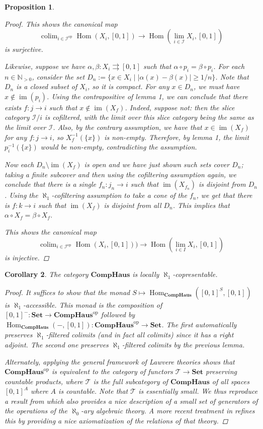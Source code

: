\documentclass[a4paper,12pt,reqno]{amsart}
\newtheorem{proposition}{Proposition}
\newtheorem{corollary}[proposition]{Corollary}
\newcommand{\Hom}{\operatorname{Hom}}
\newcommand{\op}{\operatorname{op}}
\newcommand{\CompHaus}{\mathbf{CompHaus}}
\newcommand{\Set}{\mathbf{Set}}
\newcommand{\im}{\operatorname{im}}
\newcommand{\I}{\mathcal{I}}
\newcommand{\calT}{\mathcal{T}}
\newcommand{\INnz}{\mathbb{N}_{>0}}
\newcommand{\colim}{\operatorname{colim}}
\begin{document}
\begin{proposition}
\begin{proof}
		This shows the canonical map
		$$\colim_{i\in \I^{\op}} \Hom(X_i, [0,1]) \to \Hom(\lim_{i\in \I} X_i, [0,1])$$
		is surjective.
		
		Likewise, suppose we have $\alpha, \beta : X_i \rightrightarrows [0,1]$ such that $\alpha \circ p_i = \beta \circ p_i$. For each $n\in \INnz$, consider the set $D_n := \{ x \in X_i \mid |\alpha(x) - \beta(x)| \ge 1/n \}$. Note that $D_n$ is a closed subset of $X_i$, so it is compact. For any $x \in D_n$, we must have $x \notin \im(p_i)$. Using the contrapositive of lemma 1, we can conclude that there exists $f : j \to i$ such that $x \not\in \im(X_f)$. Indeed, suppose not: then the slice category $\I / i$ is cofiltered, with the limit over this slice category being the same as the limit over $\I$. Also, by the contrary assumption, we have that $x \in \im(X_f)$ for any $f : j \to i$, so $X_f^{-1}(\{ x \})$ is non-empty. Therefore, by lemma 1, the limit $p_i^{-1}(\{ x \})$ would be non-empty, contradicting the assumption.
		
		Now each $D_n \setminus \im(X_f)$ is open and we have just shown such sets cover $D_n$; taking a finite subcover and then using the cofiltering assumption again, we conclude that there is a single $f_n : j_n \to i$ such that $\im(X_{f_n})$ is disjoint from $D_n$. Using the $\aleph_1$-cofiltering assumption to take a cone of the $f_n$, we get that there is $f : k \to i$ such that $\im(X_f)$ is disjoint from all $D_n$. This implies that $\alpha \circ X_f = \beta \circ X_f$.
		
		This shows the canonical map
		$$\colim_{i\in \I^{\op}} \Hom(X_i, [0,1])) \to \Hom(\lim_{i\in I} X_i, [0,1])$$
		is injective.
	\end{proof}
\end{proposition}

\begin{corollary}
	The category $\CompHaus$ is locally $\aleph_1$-copresentable.
	
	\begin{proof}
		It suffices to show that the monad $S \mapsto \Hom_{\CompHaus}([0, 1]^S, [0, 1])$ is $\aleph_1$-accessible. This monad is the composition of $[0, 1]^{-} : \Set \to \CompHaus^{\op}$ followed by $\Hom_{\CompHaus}({-}, [0,1]) : \CompHaus^{\op} \to \Set$. The first automatically preserves $\aleph_1$-filtered colimits (and in fact all colimits) since it has a right adjoint. The second one preserves $\aleph_1$-filtered colimits by the previous lemma.
		
		Alternately, applying the general framework of Lawvere theories shows that $\CompHaus^{\op}$ is equivalent to the category of functors $\calT \to \Set$ preserving countable products, where $\calT$ is the full subcategory of $\CompHaus$ of all spaces $[0,1]^A$ where $A$ is countable. Note that $\calT$ is essentially small. We thus reproduce a result from \cite{Isb82} which also provides a nice description of a small set of generators of the operations of the $\aleph_0$-ary algebraic theory. A more recent treatment in \cite{Marra_2017} refines this by providing a nice axiomatization of the relations of that theory.
	\end{proof}
\end{corollary}

\nocite{marra2020characterisationcategorycompacthausdorff}
\nocite{HUSEK2019251}


\end{document}
